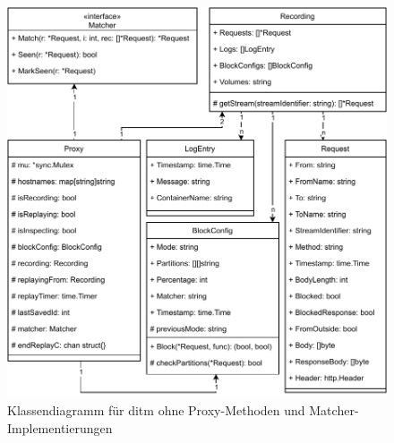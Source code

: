 \documentclass[12pt,a4paper]{report}
\begin{document}
\begin{figure}[H]
	\centering
	\includegraphics[width=\linewidth]{img/ditm-Class.pdf}
	\caption{Klassendiagramm für ditm ohne Proxy-Methoden und Matcher-Implementierungen}
	\label{fig:class}
\end{figure}
\end{document}
